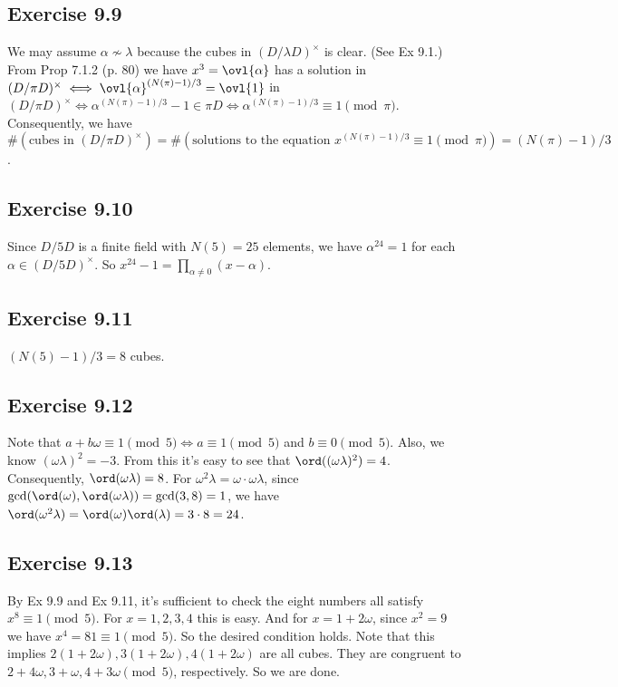 \documentclass[../Chapter.tex]{subfiles}
\begin{document}
\subsection*{Exercise 9.9}

We may assume $\alpha\not\sim\lambda$ because the cubes in $(D/\lambda D)^\times$ is clear. (See Ex 9.1.) From Prop 7.1.2 (p. 80) we have $x^3=\ovl{\alpha}$ has a solution in $(D/\pi D)^\times \iff \ovl{\alpha}^{(N(\pi)-1)/3}=\ovl{1}$ in $(D/\pi D)^\times \iff \alpha^{(N(\pi)-1)/3}-1\in\pi D \iff \alpha^{(N(\pi)-1)/3}\equiv1\pmod{\pi}$. Consequently, we have $\#(\text{cubes in }(D/\pi D)^\times)=\#(\text{solutions to the equation } x^{(N(\pi)-1)/3}\equiv1\pmod{\pi})=(N(\pi)-1)/3$.

\subsection*{Exercise 9.10}

Since $D/5D$ is a finite field with $N(5)=25$ elements, we have $\alpha^{24}=1$ for each $\alpha\in(D/5D)^\times$. So $x^{24}-1=\prod_{\alpha\neq0} (x-\alpha)$.

\subsection*{Exercise 9.11}

$(N(5)-1)/3=8$ cubes.

\subsection*{Exercise 9.12}

Note that $a+b\omega\equiv1\pmod{5} \iff a\equiv1\pmod{5}$ and $b\equiv0\pmod{5}$. Also, we know $(\omega\lambda)^2=-3$. From this it's easy to see that $\ord((\omega\lambda)^2)=4$. Consequently, $\ord(\omega\lambda)=8$. For $\omega^2\lambda=\omega\cdot\omega\lambda$, since $\gcd(\ord(\omega),\ord(\omega\lambda))=\gcd(3,8)=1$, we have $\ord(\omega^2\lambda)=\ord(\omega)\ord(\lambda)=3\cdot8=24$.

\subsection*{Exercise 9.13}

By Ex 9.9 and Ex 9.11, it's sufficient to check the eight numbers all satisfy $x^8\equiv1\pmod{5}$. For $x=1,2,3,4$ this is easy. And for $x=1+2\omega$, since $x^2=9$ we have $x^4=81\equiv1\pmod{5}$. So the desired condition holds. Note that this implies $2(1+2\omega),3(1+2\omega),4(1+2\omega)$ are all cubes. They are congruent to $2+4\omega,3+\omega,4+3\omega \pmod{5}$, respectively. So we are done.
\end{document}
